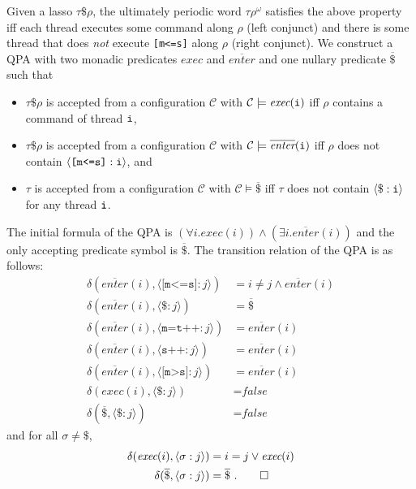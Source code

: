 \documentclass[9pt,nocopyrightspace]{sigplanconf}
\theoremstyle{definition}
\newcommand{\tuple}[1]{\langle #1 \rangle}
\newcommand{\false}{\textit{false}}
\newcommand{\idx}[1]{\text{\rm\texttt{#1}}}
\newcommand{\ic}[2]{{\tuple{#1 : #2}}}
\newcommand{\config}{\mathcal{C}}
\begin{document}
\begin{example}
Given a lasso $\tau\$\rho$, the ultimately periodic word $\tau\rho^\omega$
satisfies the above property iff each thread executes some
command along $\rho$ (left conjunct) and there is some thread that does
\emph{not} execute \texttt{[m<=s]} along $\rho$ (right conjunct).  We construct a QPA with two
monadic predicates $\textit{exec}$ and $\overline{\textit{enter}}$ and one
nullary predicate $\overline{\$}$ such that
\begin{itemize}
\item $\tau\$\rho$ is accepted from a configuration $\config$ with $\config
  \models \textit{exec}(\idx{i})$ iff $\rho$ contains a command of thread $\idx{i}$,
\item $\tau\$\rho$ is accepted from a configuration $\config$ with $\config
  \models \overline{\textit{enter}}(\idx{i})$ iff $\rho$ does not contain
  $\ic{\texttt{[m<=s]}}{\idx{i}}$, and
\item $\tau$ is accepted from a configuration $\config$ with $\config \models
  \overline{\$}$ iff $\tau$ does not contain $\ic{\$}{\idx{i}}$ for any thread
  $\idx{i}$.
\end{itemize}
The initial formula of the QPA is $(\forall i. \textit{exec}(i)) \land
(\exists i. \overline{\textit{enter}}(i))$ and the only accepting predicate
symbol is $\overline{\$}$.  The transition relation of the QPA is as follows:
\begin{align*}
  \delta(\overline{\textit{enter}}(i), \ic{\texttt{[m<=s]}}{j}) &= i \neq j \land \overline{\textit{enter}}(i)\\
  \delta(\overline{\textit{enter}}(i), \ic{\$}{j}) &= \overline{\$}\\
  \delta(\overline{\textit{enter}}(i), \ic{\texttt{m=t++}}{j}) &= \overline{\textit{enter}}(i)\\
  \delta(\overline{\textit{enter}}(i), \ic{\texttt{s++}}{j}) &= \overline{\textit{enter}}(i)\\
  \delta(\overline{\textit{enter}}(i), \ic{\texttt{[m>s]}}{j}) &= \overline{\textit{enter}}(i)\\
  \delta(\textit{exec}(i), \ic{\$}{j}) &= \false\\
  \delta(\overline{\$}, \ic{\$}{j}) &= \false
\end{align*}
and for all $\sigma \neq \$$,
\begin{align*}
  \delta(\textit{exec}(i), \ic{\sigma}{j}) &= i = j \lor \textit{exec}(i)\\
  \delta(\overline{\$}, \ic{\sigma}{j}) &= \overline{\$}\ . \qedhere
\end{align*}
\end{example}
\end{document}
